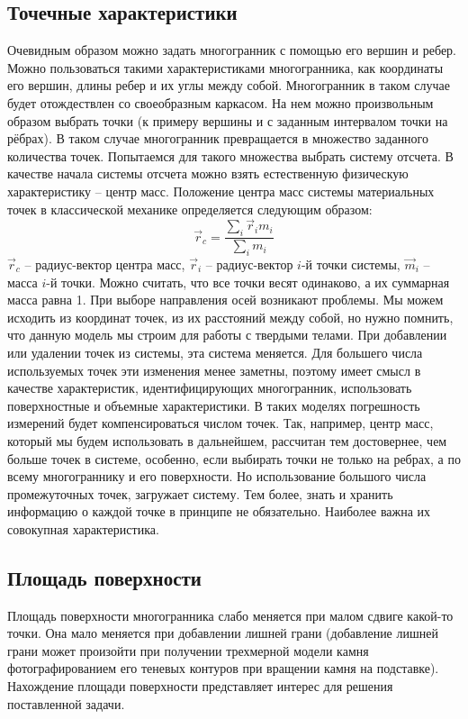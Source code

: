 \documentclass[a4paper,12pt, titlepage]{article}
\begin{document}
\subsection{Точечные характеристики}
Очевидным образом можно задать многогранник с помощью его вершин и ребер. Можно пользоваться такими характеристиками
многогранника, как координаты его вершин, длины ребер и их углы между собой. Многогранник в таком случае будет отождествлен 
со своеобразным каркасом. На нем можно произвольным образом выбрать точки (к примеру вершины и с заданным интервалом точки на 
рёбрах). В таком случае многогранник превращается в множество заданного количества точек. Попытаемся для такого множества выбрать 
систему отсчета. В качестве начала системы отсчета можно взять естественную физическую характеристику -- центр масс. Положение 
центра масс системы материальных точек в классической механике определяется следующим образом: 
$$\vec r_{c} = \frac{\sum\limits_{i} {\vec {r}_{i}}{m}_{i}}{\sum\limits_{i} {m}_{i}}$$
$\vec r_{c}$ -- радиус-вектор центра масс, $\vec r_{i}$ -- радиус-вектор $i$-й точки системы, $\vec m_{i}$ -- масса $i$-й точки.
Можно считать, что все точки весят одинаково, а их суммарная масса равна 1.
При выборе направления осей возникают проблемы. Мы можем исходить из координат точек, из их расстояний между собой, но 
нужно помнить, что данную модель мы строим для работы с твердыми телами. При добавлении или удалении точек из системы, эта 
система меняется. Для большего числа используемых точек эти изменения менее заметны, поэтому имеет смысл в качестве 
характеристик, идентифицирующих многогранник, использовать поверхностные и объемные характеристики. В таких моделях 
погрешность измерений будет компенсироваться числом точек. Так, например, центр масс, который мы будем использовать в дальнейшем,
рассчитан тем достовернее, чем больше точек в системе, особенно, 
если выбирать точки не только на ребрах, а по всему многограннику
и его поверхности. Но использование большого числа промежуточных точек, загружает систему. Тем более, знать и хранить информацию
о каждой точке в принципе не обязательно. Наиболее важна их совокупная характеристика.   

\subsection{Площадь поверхности}
Площадь поверхности многогранника слабо меняется при малом сдвиге какой-то точки. Она мало меняется при добавлении 
лишней грани (добавление лишней грани может произойти при получении трехмерной модели камня фотографированием его 
теневых контуров при вращении камня на подставке). Нахождение площади поверхности представляет интерес для решения поставленной 
задачи. 
\end{document}

